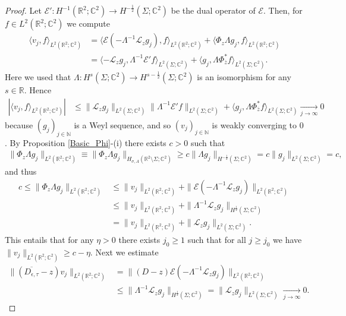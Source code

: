 \documentclass[11pt,a4paper,reqno,oneside]{amsproc}
\def \rr {{\mathbb R}}
\def \cc {{\mathbb C}}
\def \nn {{\mathbb N}}
\numberwithin{equation}{section}
\def \cc {{\mathbb{C}}}
\begin{document}
\begin{proof}
Let $\mathcal E': H^{-1}(\rr^2;\cc^2)\rightarrow H^{-\frac{1}{2}}(\Sigma;\cc^2)$ be the dual operator of $\mathcal E$. Then, for $f\in L^2(\rr^2;\cc^2)$ we compute 
\begin{align*}
\langle v_j,f \rangle_{ L^2(\rr^2;\cc^2)} &= \langle \mathcal{E}(-\Lambda^{-1}\mathcal L_z g_j), f\rangle_{ L^2(\rr^2;\cc^2)} + \langle  \Phi_z\Lambda g_j, f \rangle _{ L^2(\rr^2;\cc^2)}\\
&= \langle -\mathcal L_z g_j, \Lambda^{-1}\mathcal{E}'f\rangle_{ L^2(\Sigma;\cc^2)} + \langle   g_j,\Lambda \Phi_{\overline{z}}^\ast f \rangle_{ L^2(\Sigma;\cc^2)}.
\end{align*}
Here we used that  $\Lambda: H^s(\Sigma;\cc^2)\rightarrow H^{s-\frac{1}{2}}(\Sigma;\cc^2)$ is an isomorphism for any $s\in\rr$. Hence
\begin{align*}
\left| \langle v_j,f \rangle_{ L^2(\rr^2;\cc^2)} \right|&\leq   \| \mathcal L_z g_j\|_{ L^2(\Sigma;\cc^2)} \| \Lambda^{-1}\mathcal{E}'f\|_{ L^2(\Sigma;\cc^2)} + \langle   g_j,\Lambda \Phi_{\overline{z}}^\ast f \rangle_{ L^2(\Sigma;\cc^2)}\xrightarrow[j\to\infty]{} 0
\end{align*}
because $(g_j)_{j\in\nn}$ is a Weyl sequence, and so $(v_j)_{j\in\nn}$ is weakly converging to $0$. By Proposition \ref{Basic_Phi}-(i) there exists $c>0$ such that 
\begin{align*}
	\|\Phi_z\Lambda g_j \|_{L^2(\rr^2;\cc^2)}\equiv \|\Phi_z\Lambda g_j \|_{H_{\sigma, A}(\rr^2\setminus\Sigma;\cc^2)} \geq c\|\Lambda g_j\|_{H^{-\frac{1}{2}}(\Sigma;\cc^2)}=c  \| g_j\|_{L^2(\Sigma;\cc^2)}=c,
\end{align*}
and thus 
\begin{align*}
c \leq \|\Phi_z\Lambda g_j\|_{L^2(\rr^2;\cc^2)}&\leq  \| v_j\|_{L^2(\rr^2;\cc^2)} + \| \mathcal{E}(-\Lambda^{-1}\mathcal L_z g_j)\|_{L^2(\rr^2;\cc^2)}\\
&\leq  \| v_j\|_{L^2(\rr^2;\cc^2)} + \| \Lambda^{-1}\mathcal L_z g_j\|_{H^{\frac{1}{2}}(\Sigma;\cc^2)}\\
&=  \| v_j\|_{L^2(\rr^2;\cc^2)} + \| \mathcal L_z g_j\|_{L^2(\Sigma;\cc^2)}.
\end{align*}
This entails that for any $\eta>0$ there exists $j_0\geq 1$ such that for all $j\geq j_0$  we have $\| v_j\|_{L^2(\rr^2;\cc^2)}\geq c-\eta$. 
Next we estimate
\begin{align*}
\| ( \overline{D_{\epsilon,\tau}}- z)v_j\|_{L^2(\rr^2;\cc^2)}&= \| (D-z)\mathcal{E}(-\Lambda^{-1}\mathcal L_z g_j) \|_{L^2(\rr^2;\cc^2)}\\
& \leq \| \Lambda^{-1}\mathcal L_z g_j\|_{H^{\frac{1}{2}}(\Sigma;\cc^2)}= \| \mathcal L_z g_j\|_{L^2(\Sigma;\cc^2)}\xrightarrow[j\to\infty]{} 0.

\end{align*}
\end{proof}
\end{document}
